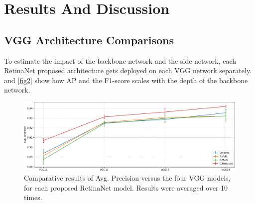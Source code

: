 \chapter{Results And Discussion} \label{Chapter:Results}

\section{VGG Architecture Comparisons}
To estimate the impact of the backbone network and the side-network, each RetinaNet proposed architecture gets deployed on each VGG network separately.  and \ref{fig2} show how AP and the F1-score scales with the depth of the backbone network.   

\begin{figure}[!htb]
  \centering
  \includegraphics[width=\textwidth]{figures/ch4/fig1.pdf}
  \caption{Comparative results of Avg. Precision versus the four VGG models, for each proposed RetinaNet model. Results were averaged over 10 times.}
  \label{fig1}
\end{figure}

\begin{table}[!htb]
  \centering
  \caption{Indicative values of Avg. Precision for the selected four VGG models, for each proposed RetinaNet model (). Parentheses indicate the input resolution.}
  \label{tab1}
\end{table}

